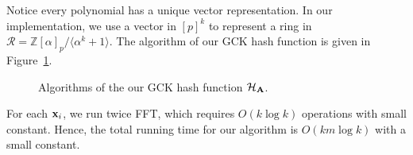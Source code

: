 Notice every polynomial has a unique vector representation. In our implementation, we use a vector in $[p]^{k}$ to represent a ring in $\mathcal{R}= \mathbb{Z}[\alpha]_{p}/\langle \alpha^{k}+1 \rangle$. The algorithm of our GCK hash function is given in Figure~\ref{gck_alg}.
\begin{figure}[h!]
{\centering
{}}
\caption{\label{gck_alg}Algorithms of the our GCK hash function ${\cal H}_{\bf A}$.}
\end{figure}
For each ${\bf x}_{i}$, we run twice FFT, which requires $O(k \log k )$ operations with small constant. Hence, the total running time for our algorithm is $O(k m \log k)$ with a small constant.
 
 
 
 
